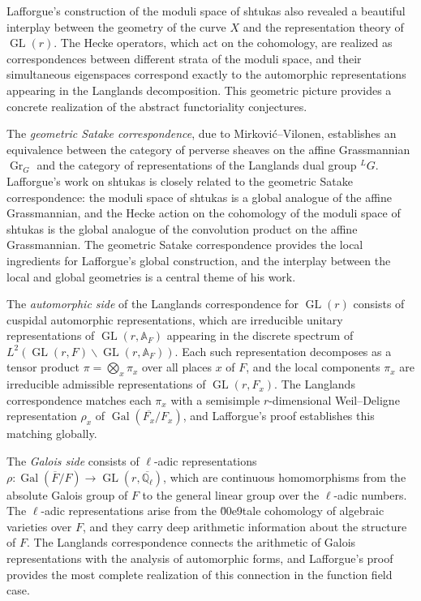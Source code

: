 Lafforgue's construction of the moduli space of shtukas also revealed a beautiful interplay between the geometry of the curve $X$ and the representation theory of $\operatorname{GL}(r)$. The Hecke operators, which act on the cohomology, are realized as correspondences between different strata of the moduli space, and their simultaneous eigenspaces correspond exactly to the automorphic representations appearing in the Langlands decomposition. This geometric picture provides a concrete realization of the abstract functoriality conjectures.

The \emph{geometric Satake correspondence}, due to Mirkovi\'{c}--Vilonen, establishes an equivalence between the category of perverse sheaves on the affine Grassmannian $\operatorname{Gr}_G$ and the category of representations of the Langlands dual group ${}^L G$. Lafforgue's work on shtukas is closely related to the geometric Satake correspondence: the moduli space of shtukas is a global analogue of the affine Grassmannian, and the Hecke action on the cohomology of the moduli space of shtukas is the global analogue of the convolution product on the affine Grassmannian. The geometric Satake correspondence provides the local ingredients for Lafforgue's global construction, and the interplay between the local and global geometries is a central theme of his work.

The \emph{automorphic side} of the Langlands correspondence for $\operatorname{GL}(r)$ consists of cuspidal automorphic representations, which are irreducible unitary representations of $\operatorname{GL}(r, \mathbb{A}_F)$ appearing in the discrete spectrum of $L^2(\operatorname{GL}(r, F) \backslash \operatorname{GL}(r, \mathbb{A}_F))$. Each such representation decomposes as a tensor product $\pi = \bigotimes_x \pi_x$ over all places $x$ of $F$, and the local components $\pi_x$ are irreducible admissible representations of $\operatorname{GL}(r, F_x)$. The Langlands correspondence matches each $\pi_x$ with a semisimple $r$-dimensional Weil--Deligne representation $\rho_x$ of $\operatorname{Gal}(\overline{F_x}/F_x)$, and Lafforgue's proof establishes this matching globally.

The \emph{Galois side} consists of $\ell$-adic representations $\rho: \operatorname{Gal}(\overline{F}/F) \to \operatorname{GL}(r, \overline{\mathbb{Q}_\ell})$, which are continuous homomorphisms from the absolute Galois group of $F$ to the general linear group over the $\ell$-adic numbers. The $\ell$-adic representations arise from the \u00e9tale cohomology of algebraic varieties over $F$, and they carry deep arithmetic information about the structure of $F$. The Langlands correspondence connects the arithmetic of Galois representations with the analysis of automorphic forms, and Lafforgue's proof provides the most complete realization of this connection in the function field case.

